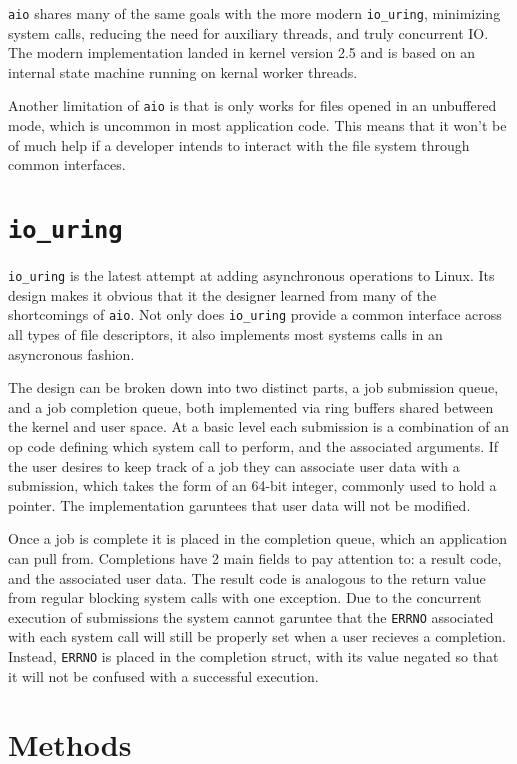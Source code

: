 \documentclass[letterpaper, 10pt, twocolumn]{article}
\begin{document}
\texttt{aio} shares many of the same goals with the more modern \texttt{io\_uring}, minimizing system calls, reducing the need for auxiliary threads, and truly concurrent IO. The modern implementation landed in kernel version 2.5 and is based on an internal state machine running on kernal worker threads.

Another limitation of \texttt{aio} is that is only works for files opened in an unbuffered mode, which is uncommon in most application code. This means that it won't be of much help if a developer intends to interact with the file system through common interfaces.

\section{\texttt{io\_uring}}
\label{sec:org2605170}
\texttt{io\_uring} is the latest attempt at adding asynchronous operations to Linux. Its design makes it obvious that it the designer learned from many of the shortcomings of \texttt{aio}. Not only does \texttt{io\_uring} provide a common interface across all types of file descriptors, it also implements most systems calls in an asyncronous fashion.

The design can be broken down into two distinct parts, a job submission queue, and a job completion queue, both implemented via ring buffers shared between the kernel and user space. At a basic level each submission is a combination of an op code defining which system call to perform, and the associated arguments. If the user desires to keep track of a job they can associate user data with a submission, which takes the form of an 64-bit integer, commonly used to hold a pointer. The implementation garuntees that user data will not be modified.

Once a job is complete it is placed in the completion queue, which an application can pull from. Completions have 2 main fields to pay attention to: a result code, and the associated user data. The result code is analogous to the return value from regular blocking system calls with one exception. Due to the concurrent execution of submissions the system cannot garuntee that the \texttt{ERRNO} associated with each system call will still be properly set when a user recieves a completion. Instead, \texttt{ERRNO} is placed in the completion struct, with its value negated so that it will not be confused with a successful execution.

\section{Methods}
\label{sec:org525ece9}
\end{document}
